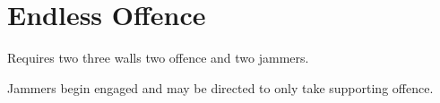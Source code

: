 \section{Endless Offence}

Requires two three walls two offence and two jammers. 

Jammers begin engaged and may be directed to only take supporting offence. 

